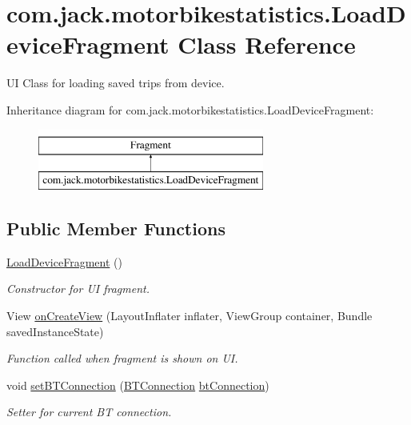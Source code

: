 \hypertarget{classcom_1_1jack_1_1motorbikestatistics_1_1_load_device_fragment}{}\section{com.\+jack.\+motorbikestatistics.\+Load\+Device\+Fragment Class Reference}
\label{classcom_1_1jack_1_1motorbikestatistics_1_1_load_device_fragment}


UI Class for loading saved trips from device.  


Inheritance diagram for com.\+jack.\+motorbikestatistics.\+Load\+Device\+Fragment\+:\begin{figure}[H]
\begin{center}
\leavevmode
\includegraphics[height=2.000000cm]{classcom_1_1jack_1_1motorbikestatistics_1_1_load_device_fragment}
\end{center}
\end{figure}
\subsection*{Public Member Functions}
\begin{DoxyCompactItemize}
\item 
\hyperlink{classcom_1_1jack_1_1motorbikestatistics_1_1_load_device_fragment_aaa7330cd6556cd8a87e8b226d796d508}{Load\+Device\+Fragment} ()
\begin{DoxyCompactList}\small\item\em Constructor for UI fragment. \end{DoxyCompactList}\item 
View \hyperlink{classcom_1_1jack_1_1motorbikestatistics_1_1_load_device_fragment_a9ad9f0d9ef69417e2131613009c02338}{on\+Create\+View} (Layout\+Inflater inflater, View\+Group container, Bundle saved\+Instance\+State)
\begin{DoxyCompactList}\small\item\em Function called when fragment is shown on UI. \end{DoxyCompactList}\item 
void \hyperlink{classcom_1_1jack_1_1motorbikestatistics_1_1_load_device_fragment_aec66dc5fd944098de78ace4175fca5b6}{set\+B\+T\+Connection} (\hyperlink{classcom_1_1jack_1_1motorbikestatistics_1_1_b_t_connection}{B\+T\+Connection} \hyperlink{classcom_1_1jack_1_1motorbikestatistics_1_1_load_device_fragment_a7a446c4528638e9d169481c3ff1471b0}{bt\+Connection})
\begin{DoxyCompactList}\small\item\em Setter for current BT connection. \end{DoxyCompactList}\end{DoxyCompactItemize}
